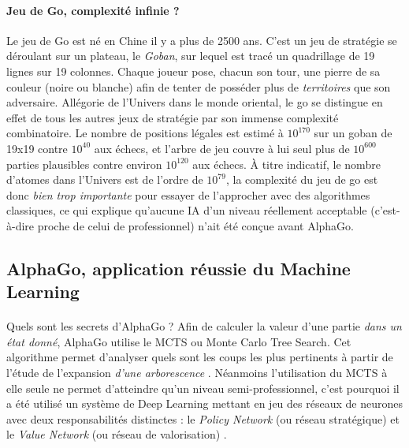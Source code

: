 \paragraph{Jeu de Go, complexité infinie ?} Le jeu de Go est né en Chine il y a plus de 2500 ans. C'est un jeu de stratégie
se déroulant sur un plateau, le \emph{Goban}, sur lequel est tracé un quadrillage de 19 lignes sur 19 colonnes. Chaque joueur
pose, chacun son tour, une pierre de sa couleur (noire ou blanche) afin de tenter de posséder plus de \emph{territoires} que
son adversaire. Allégorie de l'Univers dans le monde oriental, le go se distingue en effet de tous les autres jeux de stratégie
par son immense complexité combinatoire. Le nombre de positions légales est estimé à \begin{math}10^{170}\end{math} sur un goban
de 19x19 contre \begin{math}10^{40}\end{math} aux échecs, et l'arbre de jeu couvre à lui seul plus de \begin{math}10^{600}\end{math}
parties plausibles contre environ \begin{math}10^{120}\end{math} aux échecs. À titre indicatif, le nombre d'atomes dans l'Univers est
de l'ordre de \begin{math}10^{79}\end{math}, la complexité du jeu de go est donc \emph{bien trop importante} pour essayer de l'approcher
avec des algorithmes classiques, ce qui explique qu'aucune IA d'un niveau réellement acceptable (c'est-à-dire proche de celui de
professionnel) n'ait été conçue avant AlphaGo.


\subsection*{AlphaGo, application réussie du Machine Learning}

\paragraph{} Quels sont les secrets d'AlphaGo ? Afin de calculer la valeur 
d'une partie \emph{dans un état donné}, AlphaGo utilise le MCTS ou Monte Carlo Tree Search. Cet algorithme permet d'analyser
quels sont les coups les plus pertinents à partir de l'étude de l'expansion \emph{d'une arborescence} \cite{Heuristics0}.
Néanmoins l'utilisation du MCTS à elle seule ne permet d'atteindre qu'un niveau semi-professionnel, c'est pourquoi il a été
utilisé un système de Deep Learning mettant en jeu des réseaux de neurones avec deux responsabilités distinctes : le
\emph{Policy Network} (ou réseau stratégique) et le \emph{Value Network} (ou réseau de valorisation) \cite{AlphaGo0}.

